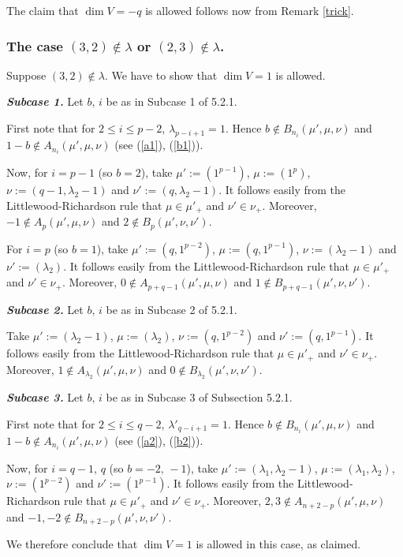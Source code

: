 \documentclass{amsart}
\theoremstyle{definition}
\begin{document}
The claim that $\dim V=-q$ is allowed follows now from Remark
\ref{trick}.

\subsubsection{\textbf{The case $(3,2)\notin \lambda$ or $(2,3)\notin
\lambda$.}} Suppose $(3,2)\notin \lambda$. We have to show that
$\dim V=1$ is allowed.

\textbf{\emph{Subcase 1.}} Let $b,\,i$ be as in Subcase 1 of 5.2.1.

First note that for $2\le i\le p-2$, $\lambda_{p-i+1}=1$. Hence
$b\notin B_{n_i}(\mu',\mu,\nu)$ and $1-b\notin
A_{n_i}(\mu',\mu,\nu)$ (see (\ref{a1}), (\ref{b1})).

Now, for $i=p-1$ (so $b=2$), take $\mu':=(1^{p-1})$, $\mu:=(1^{p})$,
$\nu:=(q-1,\lambda_2-1)$ and $\nu':=(q,\lambda_2-1)$. It follows
easily from the Littlewood-Richardson rule that $\mu\in\mu'_+$ and
$\nu'\in\nu_+$. Moreover, $-1\notin A_p(\mu',\mu,\nu)$ and $2\notin
B_p(\mu',\nu,\nu')$.

For $i=p$ (so $b=1$), take $\mu':=(q,1^{p-2})$, $\mu:=(q,1^{p-1})$,
$\nu:=(\lambda_2-1)$ and $\nu':=(\lambda_2)$. It follows easily from
the Littlewood-Richardson rule that $\mu\in\mu'_+$ and
$\nu'\in\nu_+$. Moreover, $0\notin A_{p+q-1}(\mu',\mu,\nu)$ and
$1\notin B_{p+q-1}(\mu',\nu,\nu')$.

\textbf{\emph{Subcase 2.}} Let $b,\,i$ be as in Subcase 2 of 5.2.1.

Take $\mu':=(\lambda_2-1)$, $\mu:=(\lambda_2)$, $\nu:=(q,1^{p-2})$
and $\nu':=(q,1^{p-1})$. It follows easily from the
Littlewood-Richardson rule that $\mu\in\mu'_+$ and $\nu'\in\nu_+$.
Moreover, $1\notin A_{\lambda_2}(\mu',\mu,\nu)$ and $0\notin
B_{\lambda_2}(\mu',\nu,\nu')$.

\textbf{\emph{Subcase 3.}} Let $b,\,i$ be as in Subcase 3 of
Subsection 5.2.1.

First note that for $2\le i\le q-2$, $\lambda'_{q-i+1}=1$. Hence
$b\notin B_{n_i}(\mu',\mu,\nu)$ and $1-b\notin
A_{n_i}(\mu',\mu,\nu)$ (see (\ref{a2}), (\ref{b2})).

Now, for $i=q-1,\,q$ (so $b=-2,\,-1$), take
$\mu':=(\lambda_1,\lambda_2-1)$, $\mu:=(\lambda_1,\lambda_2)$,
$\nu:=(1^{p-2})$ and $\nu':=(1^{p-1})$. It follows easily from the
Littlewood-Richardson rule that $\mu\in\mu'_+$ and $\nu'\in\nu_+$.
Moreover, $2,3\notin A_{n+2-p}(\mu',\mu,\nu)$ and $-1,-2\notin
B_{n+2-p}(\mu',\nu,\nu')$.

We therefore conclude that $\dim V=1$ is allowed in this case, as
claimed.
\end{document}
